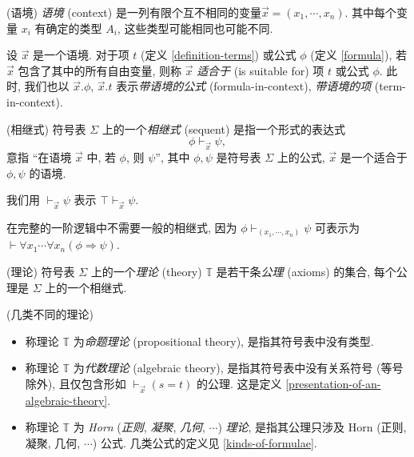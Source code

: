 \begin{definition}
	[label={definition-context}]
	{(语境)}
	\emph{语境} (context) 是一列有限个互不相同的变量\footnotemark $\vec x = (x_1,\cdots,x_n)$. 其中每个变量 $x_i$ 有确定的类型 $A_i$, 这些类型可能相同也可能不同.
	
	设 $\vec x$ 是一个语境. 对于项 $t$ (定义 \ref{definition-terms}) 或公式 $\phi$ (定义 \ref{formula}), 若 $\vec x$ 包含了其中的所有自由变量, 则称 $\vec x$ \emph{适合于} (is suitable for) 项 $t$ 或公式 $\phi$.
	此时, 我们也以 $\vec x.\phi$, $\vec x.t$ 表示\emph{带语境的公式} (formula-in-context), \emph{带语境的项} (term-in-context).
\end{definition}


\begin{definition}
	[label={sequents}]
	{(相继式)}
	符号表 $\Sigma$ 上的一个\emph{相继式} (sequent) 是指一个形式的表达式
	$$
	\phi \vdash_{\vec x} \psi,
	$$
	意指 ``在语境 $\vec x$ 中, 若 $\phi$, 则 $\psi$'', 其中 $\phi,\psi$ 是符号表 $\Sigma$ 上的公式,
	$\vec x$ 是一个适合于 $\phi,\psi$ 的语境.
	
	我们用 $\vdash_{\vec x} \psi$ 表示 $\top\vdash_{\vec x} \psi$.
\end{definition}

\begin{remark}
	[label={remark-full-first-order-logic-no-need-sequents}]
	{}
	在完整的一阶逻辑中不需要一般的相继式, 因为
	$\phi \vdash_{(x_1,\cdots,x_n)} \psi$ 可表示为
	$\vdash \forall x_1\cdots \forall x_n (\phi\Rightarrow \psi)$.
\end{remark}

\begin{definition}
	[label={theory-on-signature}]
	{(理论)}
	符号表 $\Sigma$ 上的一个\emph{理论} (theory) $\mathbb T$ 是若干条\emph{公理} (axioms) 的集合, 每个公理是 $\Sigma$ 上的一个相继式.
\end{definition}

\begin{definition}
	[label={kinds-of-theories}]
	{(几类不同的理论)}
	\begin{itemize}
		\item 称理论 $\mathbb T$ 为\emph{命题理论} (propositional theory), 是指其符号表中没有类型.
		\item 称理论 $\mathbb T$ 为\emph{代数理论} (algebraic theory), 是指其符号表中没有关系符号 (等号除外), 且仅包含形如 $\vdash_{\vec x} (s=t)$ 的公理. 这是定义 \ref{presentation-of-an-algebraic-theory}.
		\item 称理论 $\mathbb T$ 为 \emph{Horn} (\emph{正则}, \emph{凝聚}, \emph{几何}, $\cdots$) \emph{理论}, 是指其公理只涉及 Horn (正则, 凝聚, 几何, $\cdots$) 公式. 几类公式的定义见 \ref{kinds-of-formulae}.
	\end{itemize}
\end{definition}

